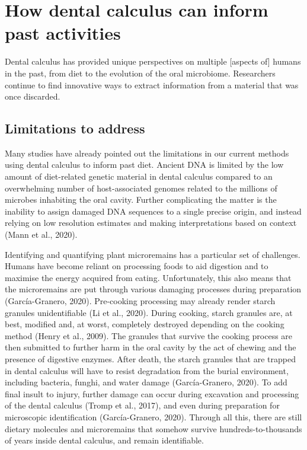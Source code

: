 \documentclass[
  letterpaper,
]{book}
\begin{document}
\hypertarget{how-dental-calculus-can-inform-past-activities}{%
\section{How dental calculus can inform past
activities}\label{how-dental-calculus-can-inform-past-activities}}

Dental calculus has provided unique perspectives on multiple {[}aspects
of{]} humans in the past, from diet to the evolution of the oral
microbiome. Researchers continue to find innovative ways to extract
information from a material that was once discarded.

\hypertarget{limitations-to-address}{%
\subsection{Limitations to address}\label{limitations-to-address}}

Many studies have already pointed out the limitations in our current
methods using dental calculus to inform past diet. Ancient DNA is
limited by the low amount of diet-related genetic material in dental
calculus compared to an overwhelming number of host-associated genomes
related to the millions of microbes inhabiting the oral cavity. Further
complicating the matter is the inability to assign damaged DNA sequences
to a single precise origin, and instead relying on low resolution
estimates and making interpretations based on context (Mann et al.,
2020).

Identifying and quantifying plant microremains has a particular set of
challenges. Humans have become reliant on processing foods to aid
digestion and to maximise the energy acquired from eating.
Unfortunately, this also means that the microremains are put through
various damaging processes during preparation (García-Granero, 2020).
Pre-cooking processing may already render starch granules unidentifiable
(Li et al., 2020). During cooking, starch granules are, at best,
modified and, at worst, completely destroyed depending on the cooking
method (Henry et al., 2009). The granules that survive the cooking
process are then submitted to further harm in the oral cavity by the act
of chewing and the presence of digestive enzymes. After death, the
starch granules that are trapped in dental calculus will have to resist
degradation from the burial environment, including bacteria, funghi, and
water damage (García-Granero, 2020). To add final insult to injury,
further damage can occur during excavation and processing of the dental
calculus (Tromp et al., 2017), and even during preparation for
microscopic identification (García-Granero, 2020). Through all this,
there are still dietary molecules and microremains that somehow survive
hundreds-to-thousands of years inside dental calculus, and remain
identifiable.
\end{document}
